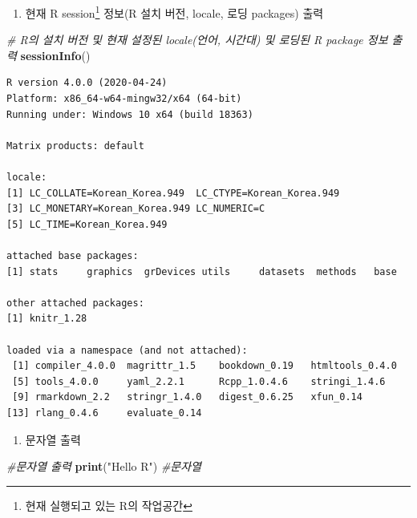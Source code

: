 \documentclass[
  11pt,
]{krantz}
\newenvironment{Shaded}{\begin{snugshade}}{\end{snugshade}}
\newcommand{\CommentTok}[1]{\textcolor[rgb]{0.37,0.37,0.37}{\textit{#1}}}
\newcommand{\KeywordTok}[1]{\textcolor[rgb]{0.27,0.27,0.27}{\textbf{#1}}}
\newcommand{\NormalTok}[1]{#1}
\newcommand{\StringTok}[1]{\textcolor[rgb]{0.5,0.5,0.5}{#1}}
\providecommand{\tightlist}{%
  \setlength{\itemsep}{0pt}\setlength{\parskip}{0pt}}
\begin{document}
\begin{enumerate}
\def\labelenumi{\arabic{enumi}.}
\tightlist
\item
  현재 R session\footnote{현재 실행되고 있는 R의 작업공간} 정보(R 설치 버전, locale, 로딩 packages) 출력
\end{enumerate}

\footnotesize

\begin{Shaded}
\begin{Highlighting}[]
\CommentTok{# R의 설치 버전 및 현재 설정된 locale(언어, 시간대) 및 로딩된 R package 정보 출력}
\KeywordTok{sessionInfo}\NormalTok{() }
\end{Highlighting}
\end{Shaded}

\begin{verbatim}
R version 4.0.0 (2020-04-24)
Platform: x86_64-w64-mingw32/x64 (64-bit)
Running under: Windows 10 x64 (build 18363)

Matrix products: default

locale:
[1] LC_COLLATE=Korean_Korea.949  LC_CTYPE=Korean_Korea.949   
[3] LC_MONETARY=Korean_Korea.949 LC_NUMERIC=C                
[5] LC_TIME=Korean_Korea.949    

attached base packages:
[1] stats     graphics  grDevices utils     datasets  methods   base     

other attached packages:
[1] knitr_1.28

loaded via a namespace (and not attached):
 [1] compiler_4.0.0  magrittr_1.5    bookdown_0.19   htmltools_0.4.0
 [5] tools_4.0.0     yaml_2.2.1      Rcpp_1.0.4.6    stringi_1.4.6  
 [9] rmarkdown_2.2   stringr_1.4.0   digest_0.6.25   xfun_0.14      
[13] rlang_0.4.6     evaluate_0.14  
\end{verbatim}

\normalsize

\begin{enumerate}
\def\labelenumi{\arabic{enumi}.}
\setcounter{enumi}{1}
\tightlist
\item
  문자열 출력
\end{enumerate}

\footnotesize

\begin{Shaded}
\begin{Highlighting}[]
\CommentTok{#문자열 출력}
\KeywordTok{print}\NormalTok{(}\StringTok{"Hello R"}\NormalTok{) }\CommentTok{#문자열}
\end{Highlighting}
\end{Shaded}
\end{document}

